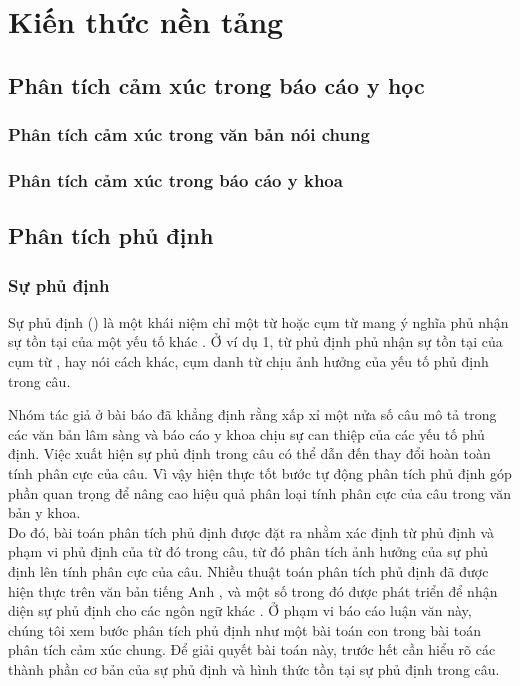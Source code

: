 \section{Kiến thức nền tảng}
\subsection{Phân tích cảm xúc trong báo cáo y học}
\subsubsection*{Phân tích cảm xúc trong văn bản nói chung}
\subsubsection*{Phân tích cảm xúc trong báo cáo y khoa}
\subsection{Phân tích phủ định}
\subsubsection*{Sự phủ định}
Sự phủ định () là một khái niệm chỉ một từ hoặc cụm từ mang ý nghĩa phủ nhận sự tồn tại của một yếu tố khác \cite{skeppstedt2016marker}. Ở ví dụ 1, từ phủ định  phủ nhận sự tồn tại của cụm từ , hay nói cách khác, cụm danh từ  chịu ảnh hưởng của yếu tố phủ định trong câu. 


Nhóm tác giả ở bài báo \cite{chapman2001evaluation} đã khẳng định rằng xấp xỉ một nửa số câu mô tả trong các văn bản lâm sàng và báo cáo y khoa chịu sự can thiệp của các yếu tố phủ định. Việc xuất hiện sự phủ định trong câu có thể dẫn đến thay đổi hoàn toàn tính phân cực của câu. Vì vậy hiện thực tốt bước tự động phân tích phủ định góp phần quan trọng để nâng cao hiệu quả phân loại tính phân cực của câu trong văn bản y khoa.\\

Do đó, bài toán phân tích phủ định được đặt ra nhằm xác định từ phủ định và phạm vi phủ định của từ đó trong câu, từ đó phân tích ảnh hưởng của sự phủ định lên tính phân cực của câu. Nhiều thuật toán phân tích phủ định đã được hiện thực trên văn bản tiếng Anh \cite{Aronow1999, chapman2001evaluation, Mutalik2001, Elkin2005, Zeng2007}, và một số trong đó được phát triển để nhận diện sự phủ định cho các ngôn ngữ khác \cite{benamara2012how, costumero2014an, Chapman2013, CruzDiaz2015, gindl2006negation}. Ở phạm vi báo cáo luận văn này, chúng tôi xem bước phân tích phủ định như một bài toán con trong bài toán phân tích cảm xúc chung. Để giải quyết bài toán này, trước hết cần hiểu rõ các thành phần cơ bản của sự phủ định và hình thức tồn tại sự phủ định trong câu.

